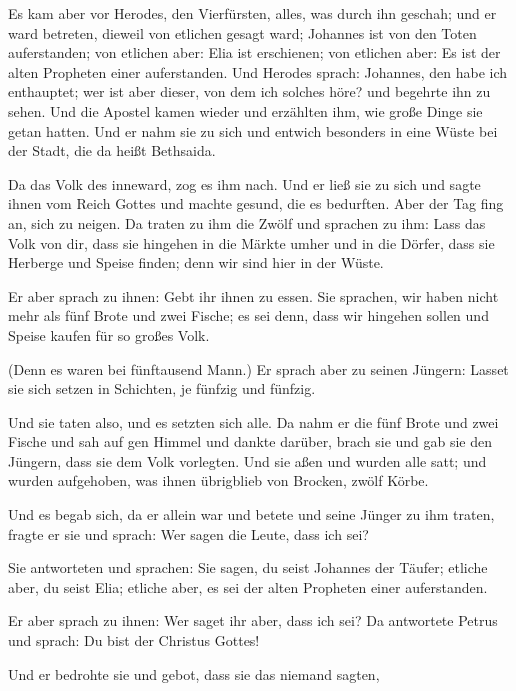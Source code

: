  Es kam aber vor Herodes, den Vierfürsten, alles, was
durch ihn geschah; und er ward betreten, dieweil von etlichen gesagt
ward; Johannes ist von den Toten auferstanden;  von
etlichen aber: Elia ist erschienen; von etlichen aber: Es ist der alten
Propheten einer auferstanden.  Und Herodes sprach:
Johannes, den habe ich enthauptet; wer ist aber dieser, von dem ich
solches höre? und begehrte ihn zu sehen.  Und die Apostel
kamen wieder und erzählten ihm, wie große Dinge sie getan hatten. Und er
nahm sie zu sich und entwich besonders in eine Wüste bei der Stadt, die
da heißt Bethsaida.

 Da das Volk des inneward, zog es ihm nach. Und er ließ
sie zu sich und sagte ihnen vom Reich Gottes und machte gesund, die es
bedurften. Aber der Tag fing an, sich zu neigen.  Da
traten zu ihm die Zwölf und sprachen zu ihm: Lass das Volk von dir, dass
sie hingehen in die Märkte umher und in die Dörfer, dass sie Herberge
und Speise finden; denn wir sind hier in der Wüste.

 Er aber sprach zu ihnen: Gebt ihr ihnen zu essen. Sie
sprachen, wir haben nicht mehr als fünf Brote und zwei Fische; es sei
denn, dass wir hingehen sollen und Speise kaufen für so großes Volk.

 (Denn es waren bei fünftausend Mann.) Er sprach aber zu
seinen Jüngern: Lasset sie sich setzen in Schichten, je fünfzig und
fünfzig.

 Und sie taten also, und es setzten sich alle.
 Da nahm er die fünf Brote und zwei Fische und sah auf
gen Himmel und dankte darüber, brach sie und gab sie den Jüngern, dass
sie dem Volk vorlegten.  Und sie aßen und wurden alle
satt; und wurden aufgehoben, was ihnen übrigblieb von Brocken, zwölf
Körbe.

 Und es begab sich, da er allein war und betete und seine
Jünger zu ihm traten, fragte er sie und sprach: Wer sagen die Leute,
dass ich sei?

 Sie antworteten und sprachen: Sie sagen, du seist
Johannes der Täufer; etliche aber, du seist Elia; etliche aber, es sei
der alten Propheten einer auferstanden.

 Er aber sprach zu ihnen: Wer saget ihr aber, dass ich
sei? Da antwortete Petrus und sprach: Du bist der Christus Gottes!

 Und er bedrohte sie und gebot, dass sie das niemand
sagten,


